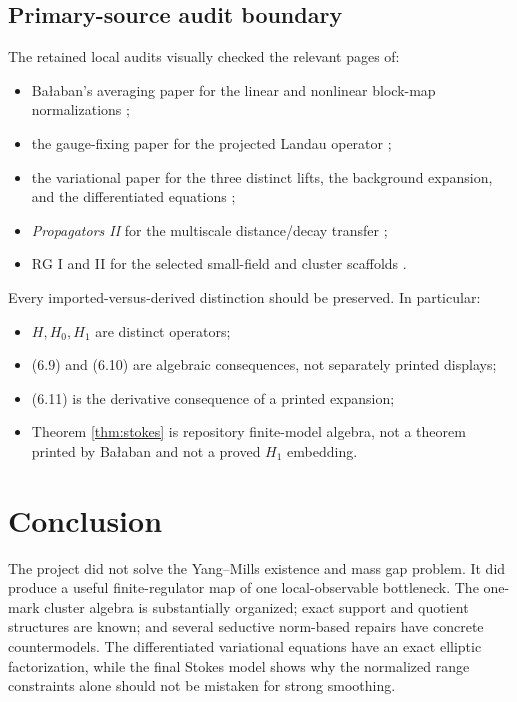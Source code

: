 \documentclass[11pt]{article}
\theoremstyle{definition}
\newcommand{\YM}{Yang--Mills}
\newcommand{\RG}{\mathrm{RG}}
\begin{document}
\subsection{Primary-source audit boundary}

The retained local audits visually checked the relevant pages of:
\begin{itemize}
  \item Ba{\l}aban's averaging paper for the linear and nonlinear block-map
  normalizations \cite{balaban1985averaging};
  \item the gauge-fixing paper for the projected Landau operator
  \cite{balaban1985gaugefixing};
  \item the variational paper for the three distinct lifts, the background
  expansion, and the differentiated equations
  \cite{balaban1985variational};
  \item \emph{Propagators II} for the multiscale distance/decay transfer
  \cite{balaban1984propagatorsII};
  \item \(\RG\) I and II for the selected small-field and cluster scaffolds
  \cite{balaban1987rgi,balaban1988rgii}.
\end{itemize}
Every imported-versus-derived distinction should be preserved.  In
particular:
\begin{itemize}
  \item \(H,H_0,H_1\) are distinct operators;
  \item (6.9) and (6.10) are algebraic consequences, not separately printed
  displays;
  \item (6.11) is the derivative consequence of a printed expansion;
  \item Theorem \ref{thm:stokes} is repository finite-model algebra, not a
  theorem printed by Ba{\l}aban and not a proved \(H_1\) embedding.
\end{itemize}

\section{Conclusion}

The project did not solve the \YM{} existence and mass gap problem.  It did
produce a useful finite-regulator map of one local-observable bottleneck.
The one-mark cluster algebra is substantially organized; exact support and
quotient structures are known; and several seductive norm-based repairs
have concrete countermodels.  The differentiated variational equations have
an exact elliptic factorization, while the final Stokes model shows why the
normalized range constraints alone should not be mistaken for strong
smoothing.
\end{document}
